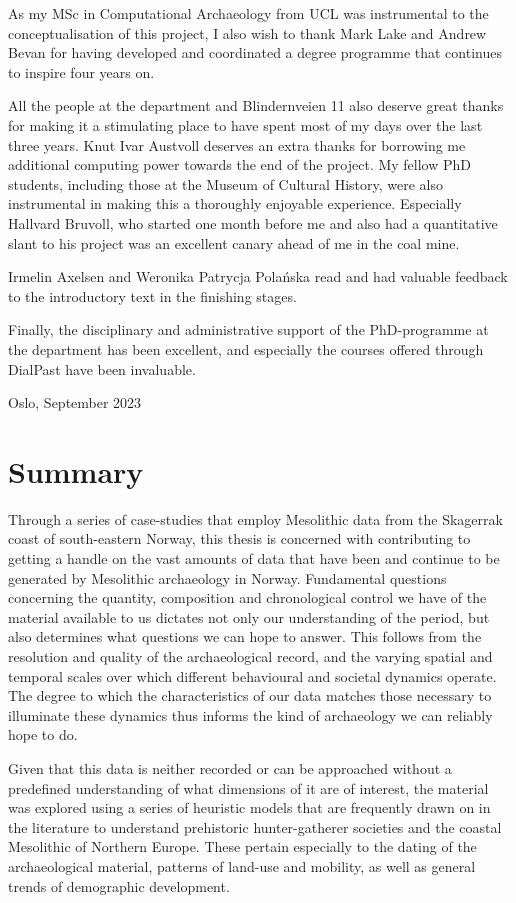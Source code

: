 As my MSc in Computational Archaeology from UCL was instrumental to the conceptualisation of this project, I also wish to thank Mark Lake and Andrew Bevan for having developed and coordinated a degree programme that continues to inspire four years on.

All the people at the department and Blindernveien 11 also deserve great thanks for making it a stimulating place to have spent most of my days over the last three years. Knut Ivar Austvoll deserves an extra thanks for borrowing me additional computing power towards the end of the project. My fellow PhD students, including those at the Museum of Cultural History, were also instrumental in making this a thoroughly enjoyable experience. Especially Hallvard Bruvoll, who started one month before me and also had a quantitative slant to his project was an excellent canary ahead of me in the coal mine.

Irmelin Axelsen and Weronika Patrycja Polańska read and had valuable feedback to the introductory text in the finishing stages.

Finally, the disciplinary and administrative support of the PhD-programme at the department has been excellent, and especially the courses offered through DialPast have been invaluable.

\bigskip
\noindent
Oslo, September 2023
\newpage

\section*{Summary}
Through a series of case-studies that employ Mesolithic data from the Skagerrak coast of south-eastern Norway, this thesis is concerned with contributing to getting a handle on the vast amounts of data that have been and continue to be generated by Mesolithic archaeology in Norway. Fundamental questions concerning the quantity, composition and chronological control we have of the material available to us dictates not only our understanding of the period, but also determines what questions we can hope to answer. This follows from the resolution and quality of the archaeological record, and the varying spatial and temporal scales over which different behavioural and societal dynamics operate. The degree to which the characteristics of our data matches those necessary to illuminate these dynamics thus informs the kind of archaeology we can reliably hope to do.   

Given that this data is neither recorded or can be approached without a predefined understanding of what dimensions of it are of interest, the material was explored using a series of heuristic models that are frequently drawn on in the literature to understand prehistoric hunter-gatherer societies and the coastal Mesolithic of Northern Europe. These pertain especially to the dating of the archaeological material, patterns of land-use and mobility, as well as general trends of demographic development. 

